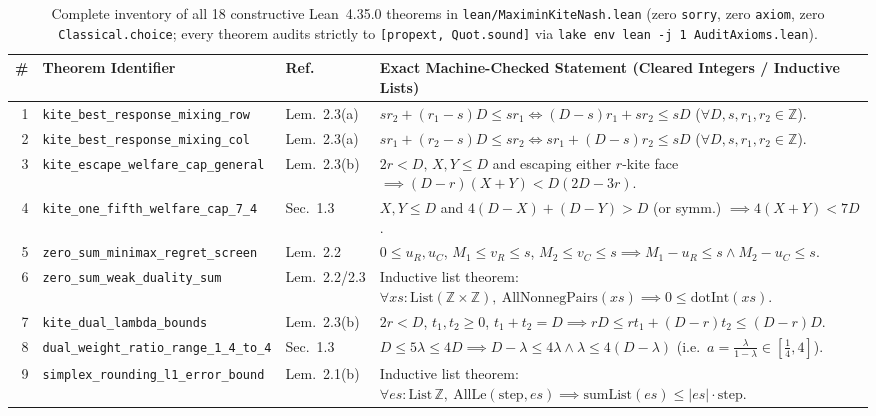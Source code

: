 \documentclass[10pt,twocolumn]{article}
\newcommand{\ZZ}{\mathbb{Z}}
\begin{document}
\begin{table}[t]
\centering
\caption{Complete inventory of all 18 constructive Lean~4.35.0 theorems in \texttt{lean/MaximinKiteNash.lean} (zero \texttt{sorry}, zero \texttt{axiom}, zero \texttt{Classical.choice}; every theorem audits strictly to \texttt{[propext, Quot.sound]} via \texttt{lake env lean -j 1 AuditAxioms.lean}).}
\label{tab:lean18}
\scriptsize
\setlength{\tabcolsep}{3.0pt}
\begin{tabular}{@{}r l l p{10.5cm}@{}}
\toprule
\# & Theorem Identifier & Ref.~\cite{cogentic2026maximin} & Exact Machine-Checked Statement (Cleared Integers / Inductive Lists) \\
\midrule
1 & \texttt{kite\_best\_response\_mixing\_row} & Lem.~2.3(a) & $s r_2 + (r_1{-}s)D \le s r_1 \iff (D{-}s)r_1 + s r_2 \le s D$ ($\forall D,s,r_1,r_2\in\ZZ$). \\
2 & \texttt{kite\_best\_response\_mixing\_col} & Lem.~2.3(a) & $s r_1 + (r_2{-}s)D \le s r_2 \iff s r_1 + (D{-}s)r_2 \le s D$ ($\forall D,s,r_1,r_2\in\ZZ$). \\
3 & \texttt{kite\_escape\_welfare\_cap\_general} & Lem.~2.3(b) & $2r<D,\,X,Y\le D$ and escaping either $r$-kite face $\implies (D{-}r)(X{+}Y) < D(2D{-}3r)$. \\
4 & \texttt{kite\_one\_fifth\_welfare\_cap\_7\_4} & Sec.~1.3 & $X,Y\le D$ and $4(D{-}X)+(D{-}Y)>D$ (or symm.) $\implies 4(X{+}Y) < 7D$. \\
5 & \texttt{zero\_sum\_minimax\_regret\_screen} & Lem.~2.2 & $0\le u_R,u_C$, $M_1\le v_R\le s$, $M_2\le v_C\le s \implies M_1{-}u_R\le s \wedge M_2{-}u_C\le s$. \\
6 & \texttt{zero\_sum\_weak\_duality\_sum} & Lem.~2.2/2.3 & Inductive list theorem: $\forall xs:\mathrm{List}(\ZZ{\times}\ZZ),\ \mathrm{AllNonnegPairs}(xs) \implies 0 \le \mathrm{dotInt}(xs)$. \\
7 & \texttt{kite\_dual\_lambda\_bounds} & Lem.~2.3(b) & $2r<D$, $t_1,t_2\ge 0$, $t_1+t_2=D \implies rD \le r t_1 + (D{-}r)t_2 \le (D{-}r)D$. \\
8 & \texttt{dual\_weight\_ratio\_range\_1\_4\_to\_4} & Sec.~1.3 & $D\le 5\lambda \le 4D \implies D{-}\lambda \le 4\lambda \wedge \lambda \le 4(D{-}\lambda)$ (i.e.\ $a=\frac{\lambda}{1-\lambda}\in[\frac14,4]$). \\
9 & \texttt{simplex\_rounding\_l1\_error\_bound} & Lem.~2.1(b) & Inductive list theorem: $\forall es:\mathrm{List}\,\ZZ,\ \mathrm{AllLe}(\mathrm{step},es)\implies \mathrm{sumList}(es)\le |es|\cdot\mathrm{step}$. \\

\end{tabular}
\end{table}
\end{document}
